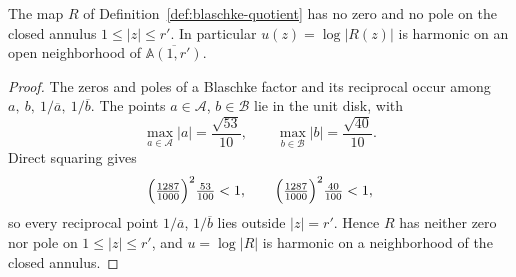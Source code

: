 \begin{lemma}\label{lem:avoid}
The map \(R\) of Definition~\ref{def:blaschke-quotient} has no zero and no pole on the closed annulus \(1\le|z|\le r'\). In particular \(u(z)=\log|R(z)|\) is harmonic on an open neighborhood of \(\overline{\mathbb A(1,r')}\).
\end{lemma}

\begin{proof}
The zeros and poles of a Blaschke factor and its reciprocal occur among \(a,\ b,\ 1/\overline a,\ 1/\overline b\). The points \(a\in\mathcal A\), \(b\in\mathcal B\) lie in the unit disk, with
\[ \max_{a\in\mathcal A}|a|=\frac{\sqrt{53}}{10},\qquad \max_{b\in\mathcal B}|b|=\frac{\sqrt{40}}{10}. \]
Direct squaring gives
\[ \Bigl(\tfrac{1287}{1000}\Bigr)^2\tfrac{53}{100}<1,\qquad \Bigl(\tfrac{1287}{1000}\Bigr)^2\tfrac{40}{100}<1, \]
so every reciprocal point \(1/\overline a\), \(1/\overline b\) lies outside \(|z|=r'\). Hence \(R\) has neither zero nor pole on \(1\le|z|\le r'\), and \(u=\log|R|\) is harmonic on a neighborhood of the closed annulus.
\end{proof}